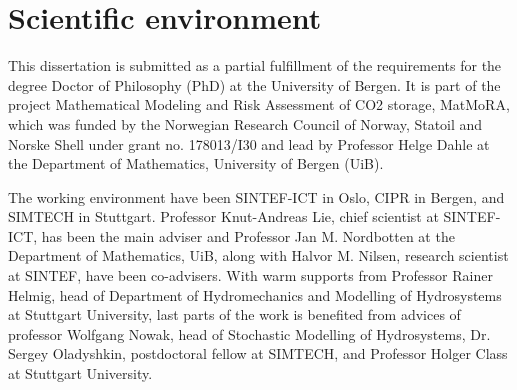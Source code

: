 \chapter{Scientific environment}

This dissertation is submitted as a partial fulfillment of the requirements for
the degree Doctor of Philosophy (PhD) at the University of Bergen. It is part
of the project Mathematical Modeling and Risk Assessment of CO2 storage,
MatMoRA, which was funded by the Norwegian Research Council of Norway, Statoil and Norske
Shell under grant no. 178013/I30 and lead by Professor Helge Dahle at the
Department of Mathematics, University of Bergen (UiB). 

The working environment have been SINTEF-ICT in Oslo, CIPR in Bergen, and
SIMTECH in Stuttgart. Professor Knut-Andreas
Lie, chief scientist at SINTEF-ICT, has been the main adviser and Professor
Jan M. Nordbotten at the Department of Mathematics, UiB, along with  Halvor M. Nilsen, research
scientist at SINTEF, have been co-advisers. With warm
supports from Professor Rainer Helmig, head of Department of Hydromechanics and
Modelling of Hydrosystems at Stuttgart University, last parts of the work is
benefited from advices of professor Wolfgang Nowak, head of Stochastic Modelling
of Hydrosystems, Dr. Sergey Oladyshkin, postdoctoral fellow at SIMTECH,
and Professor Holger Class at Stuttgart University. 